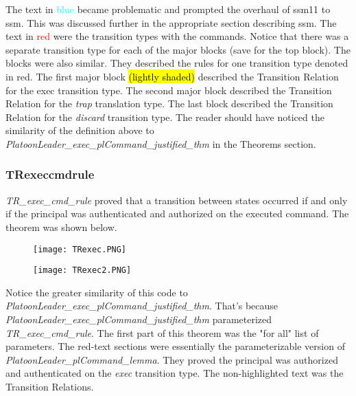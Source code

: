   
 The text in \textcolor{cyan}{blue} became problematic and prompted the overhaul of ssm11 to ssm.  This was discussed further in the appropriate section describing ssm.  The text in \textcolor{red}{red} were the transition types with the commands.  Notice that there was a separate transition type for each of the major blocks (save for the top block).  The blocks were also similar.  They described the rules for one transition type denoted in red. The first major block \hl{(lightly shaded)} described the Transition Relation for the exec transition type.  The second major block described the Transition Relation for the \emph{trap} translation type.  The last block described the Transition Relation for the \emph{discard} transition type.  The reader should have noticed the similarity of the definition above to \emph{PlatoonLeader_exec_plCommand_justified_thm} in the Theorems section.


\subsubsection{TR\textunderscore exec\textunderscore cmd\textunderscore rule}
\label{sec:trtext-exect-cmdt}


  \textit{TR_exec_cmd_rule} proved that a transition between states occurred if and only if
    the principal was authenticated and authorized on the executed command.  The theorem was shown below.\\
    
  \begin{figure}[h]
  \centering
  \texttt{[image: TRexec.PNG]}
\end{figure}
\begin{figure}[h!]
  \centering
  \texttt{[image: TRexec2.PNG]}
\end{figure}

Notice the greater similarity of this code to \emph{PlatoonLeader_exec_plCommand_justified_thm}.   That's because\emph{ PlatoonLeader_exec_plCommand_justified_thm} parameterized \emph{TR_exec_cmd_rule}.   The first part of this theorem was the "for all" list of parameters.  The red-text sections were essentially the parameterizable version of\emph{ PlatoonLeader_plCommand_lemma}.  They proved the principal was authorized and authenticated on the \emph{exec} transition type.  The non-highlighted text was the Transition Relations.  \\
  
